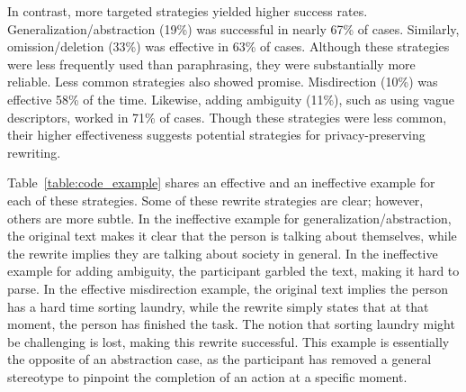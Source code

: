 In contrast, more targeted strategies yielded higher success rates. Generalization/abstraction (19\%) was successful in nearly 67\% of cases. Similarly, omission/deletion (33\%) was effective in 63\% of cases. Although these strategies were less frequently used than paraphrasing, they were substantially more reliable. Less common strategies also showed promise. Misdirection (10\%) was effective 58\% of the time. Likewise, adding ambiguity (11\%), such as using vague descriptors, worked in 71\% of cases. Though these strategies were less common, their higher effectiveness suggests potential strategies for privacy-preserving rewriting. 


Table~\ref{table:code_example} shares an effective and an ineffective example for each of these strategies. Some of these rewrite strategies are clear; however, others are more subtle. In the ineffective example for generalization/abstraction, the original text makes it clear that the person is talking about themselves, while the rewrite implies they are talking about society in general. In the ineffective example for adding ambiguity, the participant garbled the text, making it hard to parse. In the effective misdirection example, the original text implies the person has a hard time sorting laundry, while the rewrite simply states that at that moment, the person has finished the task. The notion that sorting laundry might be challenging is lost, making this rewrite successful. This example is essentially the opposite of an abstraction case, as the participant has removed a general stereotype to pinpoint the completion of an action at a specific moment.

